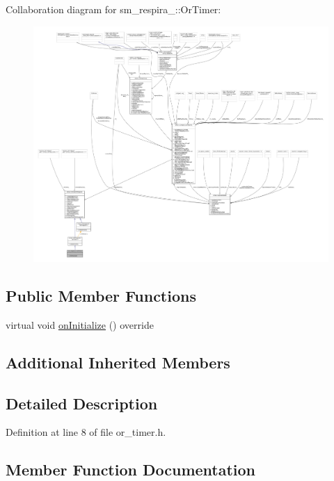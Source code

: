 Collaboration diagram for sm\+\_\+respira\+\_\+:\+:Or\+Timer\+:
\nopagebreak
\begin{figure}[H]
\begin{center}
\leavevmode
\includegraphics[width=350pt]{classsm__respira__1_1_1OrTimer__coll__graph}
\end{center}
\end{figure}
\subsection*{Public Member Functions}
\begin{DoxyCompactItemize}
\item 
virtual void \hyperlink{classsm__respira__1_1_1OrTimer_a56ebeb47c3cb724d6bb586847766c6c7}{on\+Initialize} () override
\end{DoxyCompactItemize}
\subsection*{Additional Inherited Members}


\subsection{Detailed Description}


Definition at line 8 of file or\+\_\+timer.\+h.



\subsection{Member Function Documentation}
\mbox{\label{classsm__respira__1_1_1OrTimer_a56ebeb47c3cb724d6bb586847766c6c7}} 
